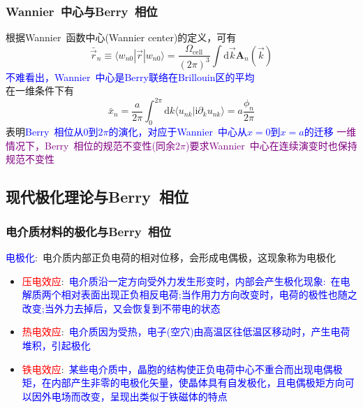 {\frame
{
	\frametitle{\textrm{Wannier~}中心与\textrm{Berry~}相位}
	根据\textrm{Wannier~}函数中心\textrm{(Wannier center)}的定义，可有
			\begin{displaymath}
				\bar{\vec r}_n\equiv\langle w_{n0}|\vec r|w_{n0}\rangle=\dfrac{\Omega_{\mathrm{cell}}}{(2\pi)^3}\int\mathrm{d}\vec k\mathbf{A}_n(\vec k)
			\end{displaymath}
			\textcolor{blue}{不难看出，\textrm{Wannier~}中心是\textrm{Berry}联络在\textrm{Brillouin}区的平均}\\
	在一维条件下有
	\begin{displaymath}
		\bar{x}_n=\dfrac{a}{2\pi}\int_0^{2\pi}\mathrm{d}k\langle u_{nk}|\mathrm{i}\partial_{k}u_{nk}\rangle=a\dfrac{\phi_n}{2\pi}
	\end{displaymath}
	表明\textcolor{blue}{\textrm{Berry~}相位从$0$到$2\pi$的演化，对应于\textrm{Wannier~}中心从$x=0$到$x=a$的迁移}
	\vskip 8pt
	\textcolor{purple}{一维情况下，\textrm{Berry~}相位的规范不变性(同余$2\pi$)要求\textrm{Wannier~}中心在连续演变时也保持规范不变性}
}

\subsection{现代极化理论与\rm{Berry~}相位}
\frame
{
	\frametitle{电介质材料的极化与\textrm{Berry~}相位}
	\textcolor{blue}{电极化}:~电介质内部正负电荷的相对位移，会形成电偶极，这现象称为电极化
	\begin{itemize}
\setlength{\itemsep}{10pt}
		\item \textcolor{red}{压电效应}:~\textcolor{blue}{电介质沿一定方向受外力发生形变时，内部会产生极化现象:~在电解质两个相对表面出现正负相反电荷;当作用力方向改变时，电荷的极性也随之改变;当外力去掉后，又会恢复到不带电的状态}
		\item \textcolor{red}{热电效应}:~\textcolor{blue}{电介质因为受热，电子(空穴)由高温区往低温区移动时，产生电荷堆积，引起极化}
		\item \textcolor{red}{铁电效应}:~\textcolor{blue}{某些电介质中，晶胞的结构使正负电荷中心不重合而出现电偶极矩，在内部产生非零的电极化矢量，使晶体具有自发极化，且电偶极矩方向可以因外电场而改变，呈现出类似于铁磁体的特点}
	\end{itemize}
}

}
